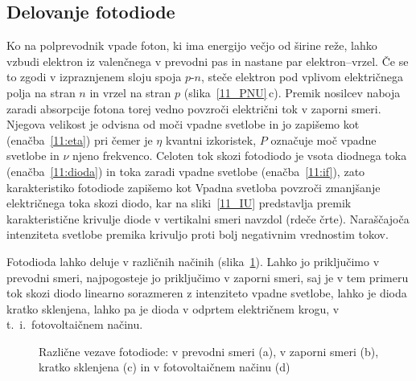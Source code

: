  
\subsection*{Delovanje fotodiode}
Ko na polprevodnik vpade foton, ki ima energijo večjo od širine reže, 
lahko vzbudi elektron iz valenčnega v prevodni pas in nastane par elektron--vrzel. 
Če se to zgodi v izpraznjenem sloju spoja $p$-$n$, steče elektron pod vplivom 
električnega polja na stran $n$ in vrzel na stran $p$ (slika~\ref{11_PNU}\,c). 
Premik nosilcev naboja zaradi absorpcije fotona torej vedno
povzroči električni tok v zaporni smeri. 
Njegova velikost je odvisna od moči vpadne svetlobe in jo zapišemo kot 
(enačba~\ref{11:eta})
pri čemer je $\eta$ kvantni izkoristek, $P$ označuje moč vpadne svetlobe in $\nu$ njeno
frekvenco. Celoten tok skozi fotodiodo je vsota diodnega toka (enačba~\ref{11:dioda}) 
in toka zaradi vpadne svetlobe (enačba~\ref{11:if}), zato karakteristiko fotodiode zapišemo kot 
Vpadna svetloba povzroči zmanjšanje električnega toka skozi diodo, 
kar na sliki~\ref{11_IU} predstavlja premik karakteristične krivulje diode v vertikalni 
smeri navzdol (rdeče črte). Naraščajoča intenziteta svetlobe premika krivuljo proti 
bolj negativnim vrednostim tokov. 

Fotodioda lahko deluje v različnih načinih (slika~\ref{11_PD}). 
Lahko jo priključimo v prevodni smeri,
najpogosteje jo priključimo v zaporni smeri, saj je v
tem primeru tok skozi diodo linearno sorazmeren z intenziteto vpadne svetlobe, lahko 
je dioda kratko sklenjena, lahko pa je dioda v odprtem električnem krogu, v t.\ i.\ fotovoltaičnem 
načinu. 
\begin{figure}[h]
\centering
\def\svgwidth{130truemm} 

\caption{Različne vezave fotodiode: v prevodni smeri (a), v zaporni smeri (b), kratko sklenjena (c) in 
v fotovoltaičnem načinu (d)}
\label{11_PD}
\end{figure}

